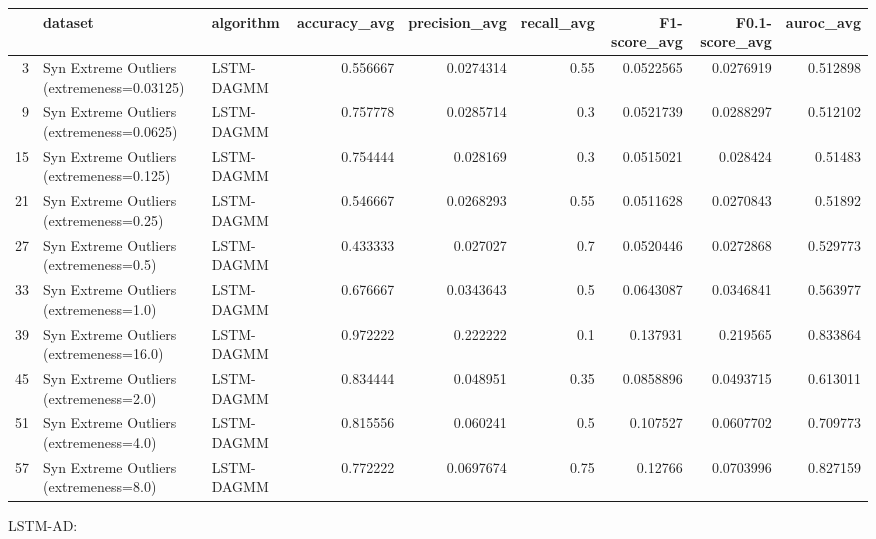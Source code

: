 \begin{tabular}{rllrrrrrr}
\hline
    & dataset                                    & algorithm   &   accuracy\_avg &   precision\_avg &   recall\_avg &   F1-score\_avg &   F0.1-score\_avg &   auroc\_avg \\
\hline
  3 & Syn Extreme Outliers (extremeness=0.03125) & LSTM-DAGMM  &       0.556667 &       0.0274314 &         0.55 &      0.0522565 &        0.0276919 &    0.512898 \\
  9 & Syn Extreme Outliers (extremeness=0.0625)  & LSTM-DAGMM  &       0.757778 &       0.0285714 &         0.3  &      0.0521739 &        0.0288297 &    0.512102 \\
 15 & Syn Extreme Outliers (extremeness=0.125)   & LSTM-DAGMM  &       0.754444 &       0.028169  &         0.3  &      0.0515021 &        0.028424  &    0.51483  \\
 21 & Syn Extreme Outliers (extremeness=0.25)    & LSTM-DAGMM  &       0.546667 &       0.0268293 &         0.55 &      0.0511628 &        0.0270843 &    0.51892  \\
 27 & Syn Extreme Outliers (extremeness=0.5)     & LSTM-DAGMM  &       0.433333 &       0.027027  &         0.7  &      0.0520446 &        0.0272868 &    0.529773 \\
 33 & Syn Extreme Outliers (extremeness=1.0)     & LSTM-DAGMM  &       0.676667 &       0.0343643 &         0.5  &      0.0643087 &        0.0346841 &    0.563977 \\
 39 & Syn Extreme Outliers (extremeness=16.0)    & LSTM-DAGMM  &       0.972222 &       0.222222  &         0.1  &      0.137931  &        0.219565  &    0.833864 \\
 45 & Syn Extreme Outliers (extremeness=2.0)     & LSTM-DAGMM  &       0.834444 &       0.048951  &         0.35 &      0.0858896 &        0.0493715 &    0.613011 \\
 51 & Syn Extreme Outliers (extremeness=4.0)     & LSTM-DAGMM  &       0.815556 &       0.060241  &         0.5  &      0.107527  &        0.0607702 &    0.709773 \\
 57 & Syn Extreme Outliers (extremeness=8.0)     & LSTM-DAGMM  &       0.772222 &       0.0697674 &         0.75 &      0.12766   &        0.0703996 &    0.827159 \\
\hline
\end{tabular}

LSTM-AD:

